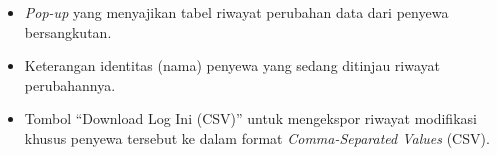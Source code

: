 \begin{itemize}
\begin{itemize}
        \item[\textbf{M.}] \textit{Pop-up} yang menyajikan tabel riwayat perubahan data dari penyewa bersangkutan.
        \item[\textbf{N.}] Keterangan identitas (nama) penyewa yang sedang ditinjau riwayat perubahannya.
        \item[\textbf{O.}] Tombol ``Download Log Ini (CSV)'' untuk mengekspor riwayat modifikasi khusus penyewa tersebut ke dalam format \textit{Comma-Separated Values} (CSV).
    \end{itemize}

\end{itemize}




































